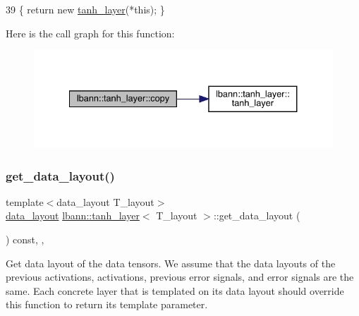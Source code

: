 \begin{DoxyCode}
39 \{ \textcolor{keywordflow}{return} \textcolor{keyword}{new} \hyperlink{classlbann_1_1tanh__layer_a24f9a6d92637571583267c5ad7bc9e84}{tanh\_layer}(*\textcolor{keyword}{this}); \}
\end{DoxyCode}
Here is the call graph for this function\+:\nopagebreak
\begin{figure}[H]
\begin{center}
\leavevmode
\includegraphics[width=334pt]{classlbann_1_1tanh__layer_ad42d3814131e6d8588c1cb4bfba8ebb6_cgraph}
\end{center}
\end{figure}
\mbox{\label{classlbann_1_1tanh__layer_acf07ab3db6f429d8bd7dd0dd659ea3e0}} 
\subsubsection{\texorpdfstring{get\+\_\+data\+\_\+layout()}{get\_data\_layout()}}
{\footnotesize\ttfamily template$<$data\+\_\+layout T\+\_\+layout$>$ \\
\hyperlink{base_8hpp_a786677cbfb3f5677b4d84f3056eb08db}{data\+\_\+layout} \hyperlink{classlbann_1_1tanh__layer}{lbann\+::tanh\+\_\+layer}$<$ T\+\_\+layout $>$\+::get\+\_\+data\+\_\+layout (\begin{DoxyParamCaption}{ }\end{DoxyParamCaption}) const\hspace{0.3cm}{\ttfamily [inline]}, {\ttfamily [override]}, {\ttfamily [virtual]}}

Get data layout of the data tensors. We assume that the data layouts of the previous activations, activations, previous error signals, and error signals are the same. Each concrete layer that is templated on its data layout should override this function to return its template parameter. 

